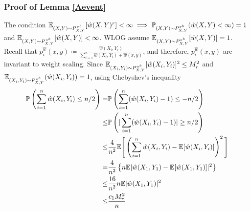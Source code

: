 \subsubsection*{Proof of Lemma \ref{Aevent}}
The condition $\mathbb{E}_{(X,Y)\sim P^{\pi^b}_{X,Y}}[\hat{w}(X, Y)^r] < \infty \implies \mathbb{P}_{(X,Y)\sim P^{\pi^b}_{X,Y}}(\hat{w}(X, Y)< \infty) = 1$ and $\mathbb{E}_{(X,Y)\sim P^{\pi^b}_{X,Y}}[\hat{w}(X, Y)]<\infty$. WLOG assume $\mathbb{E}_{(X,Y)\sim P^{\pi^b}_{X,Y}}[\hat{w}(X, Y)] = 1$. Recall that $p_{i}^{\hat{w}}(x, y) \coloneqq \frac{\hat{w}(X_i, Y_i)}{\sum_{i=1}^n \hat{w}(X_i, Y_i) + \hat{w}(x,y)}$, and therefore, $p_i^{\hat{w}}(x,y)$ are invariant to weight scaling. Since $\mathbb{E}_{(X_i, Y_i) \sim P^{\pi^b}_{X,Y}}[\hat{w}(X_i, Y_i)]^2 \leq M_r^2$ and $\mathbb{E}_{(X_i, Y_i) \sim P^{\pi^b}_{X,Y}}(\hat{w}(X_i, Y_i)) = 1$, using Chebyshev's inequality %
\begin{align}
    \mathbb{P}\left( \sum_{i=1}^n  \hat{w}(X_i, Y_i) \leq n/2 \right) =& \mathbb{P}\left( \sum_{i=1}^n  (\hat{w}(X_i, Y_i)-1) \leq -n/2 \right) \nonumber\\
    \leq& \mathbb{P}\left( |\sum_{i=1}^n  (\hat{w}(X_i, Y_i) -1)| \geq n/2 \right) \nonumber \\
    \leq& \frac{4}{n^2}\mathbb{E} \Bigg[\left( \sum_{i=1}^n \hat{w}(X_i, Y_i) - \mathbb{E}[\hat{w}(X_i, Y_i)] \right)^2\Bigg] \nonumber \\
    =& \frac{4}{n^2} \left\{ n \mathbb{E} |\hat{w}(X_1, Y_1) - \mathbb{E}[\hat{w}(X_1, Y_1)] |^2\right\}  \label{holder1}\\ 
    \leq& \frac{16}{n^2}  n \mathbb{E} |\hat{w}(X_1, Y_1)|^2  \label{holder2} \\
    \leq& \frac{c_1 M_r^2}{n} \nonumber
\end{align}
